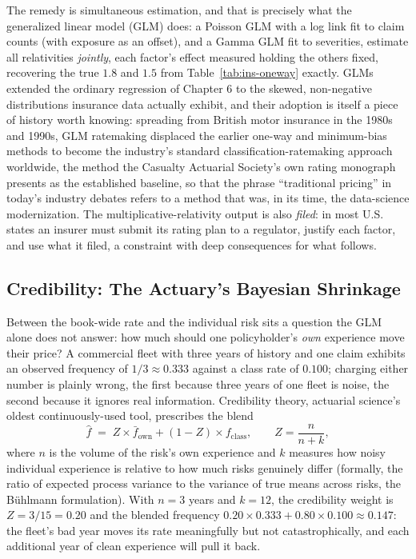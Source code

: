 \documentclass[../ai_in_finance]{subfiles}
\begin{document}
The remedy is simultaneous estimation, and that is precisely what the generalized linear model (GLM) does: a Poisson GLM with a log link fit to claim counts (with exposure as an offset), and a Gamma GLM fit to severities, estimate all relativities \emph{jointly}, each factor's effect measured holding the others fixed, recovering the true $1.8$ and $1.5$ from Table~\ref{tab:ins-oneway} exactly. GLMs extended the ordinary regression of Chapter 6 to the skewed, non-negative distributions insurance data actually exhibit, and their adoption is itself a piece of history worth knowing: spreading from British motor insurance in the 1980s and 1990s, GLM ratemaking displaced the earlier one-way and minimum-bias methods to become the industry's standard classification-ratemaking approach worldwide, the method the Casualty Actuarial Society's own rating monograph presents as the established baseline, so that the phrase ``traditional pricing'' in today's industry debates refers to a method that was, in its time, the data-science modernization. The multiplicative-relativity output is also \emph{filed}: in most U.S. states an insurer must submit its rating plan to a regulator, justify each factor, and use what it filed, a constraint with deep consequences for what follows.

\subsection{Credibility: The Actuary's Bayesian Shrinkage}
\label{sec:ins-credibility}

Between the book-wide rate and the individual risk sits a question the GLM alone does not answer: how much should one policyholder's \emph{own} experience move their price? A commercial fleet with three years of history and one claim exhibits an observed frequency of $1/3 \approx 0.333$ against a class rate of $0.100$; charging either number is plainly wrong, the first because three years of one fleet is noise, the second because it ignores real information. Credibility theory, actuarial science's oldest continuously-used tool, prescribes the blend
\begin{equation*}
\hat f \;=\; Z \times \bar f_{\text{own}} + (1 - Z) \times f_{\text{class}}, \qquad Z = \frac{n}{n + k},
\end{equation*}
where $n$ is the volume of the risk's own experience and $k$ measures how noisy individual experience is relative to how much risks genuinely differ (formally, the ratio of expected process variance to the variance of true means across risks, the B\"uhlmann formulation). With $n = 3$ years and $k = 12$, the credibility weight is $Z = 3/15 = 0.20$ and the blended frequency $0.20 \times 0.333 + 0.80 \times 0.100 \approx 0.147$: the fleet's bad year moves its rate meaningfully but not catastrophically, and each additional year of clean experience will pull it back.
\end{document}
